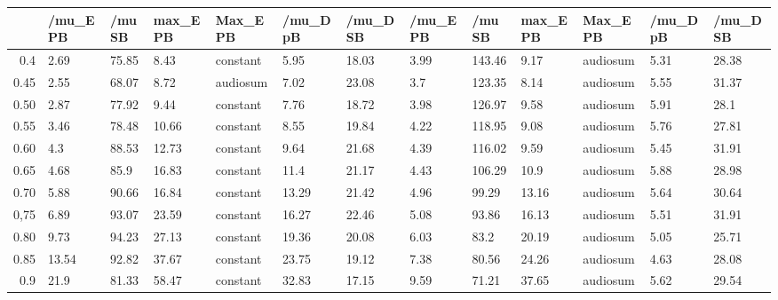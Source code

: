 \begin{table}[ht]
\centering
\begin{tabular}{rllllllllllll}
  \hline
 & /mu\_E PB & /mu SB & max\_E PB & Max\_E PB & /mu\_D pB & /mu\_D SB & /mu\_E PB & /mu SB & max\_E PB & Max\_E PB & /mu\_D pB & /mu\_D SB \\ 
  \hline
0.4 & 2.69 & 75.85 & 8.43 & constant & 5.95 & 18.03 & 3.99 & 143.46 & 9.17 & audiosum & 5.31 & 28.38 \\ 
  0.45 & 2.55 & 68.07 & 8.72 & audiosum & 7.02 & 23.08 & 3.7 & 123.35 & 8.14 & audiosum & 5.55 & 31.37 \\ 
  0.50 & 2.87 & 77.92 & 9.44 & constant & 7.76 & 18.72 & 3.98 & 126.97 & 9.58 & audiosum & 5.91 & 28.1 \\ 
  0.55 & 3.46 & 78.48 & 10.66 & constant & 8.55 & 19.84 & 4.22 & 118.95 & 9.08 & audiosum & 5.76 & 27.81 \\ 
  0.60 & 4.3 & 88.53 & 12.73 & constant & 9.64 & 21.68 & 4.39 & 116.02 & 9.59 & audiosum & 5.45 & 31.91 \\ 
  0.65 & 4.68 & 85.9 & 16.83 & constant & 11.4 & 21.17 & 4.43 & 106.29 & 10.9 & audiosum & 5.88 & 28.98 \\ 
  0.70 & 5.88 & 90.66 & 16.84 & constant & 13.29 & 21.42 & 4.96 & 99.29 & 13.16 & audiosum & 5.64 & 30.64 \\ 
  0,75 & 6.89 & 93.07 & 23.59 & constant & 16.27 & 22.46 & 5.08 & 93.86 & 16.13 & audiosum & 5.51 & 31.91 \\ 
  0.80 & 9.73 & 94.23 & 27.13 & constant & 19.36 & 20.08 & 6.03 & 83.2 & 20.19 & audiosum & 5.05 & 25.71 \\ 
  0.85 & 13.54 & 92.82 & 37.67 & constant & 23.75 & 19.12 & 7.38 & 80.56 & 24.26 & audiosum & 4.63 & 28.08 \\ 
  0.9 & 21.9 & 81.33 & 58.47 & constant & 32.83 & 17.15 & 9.59 & 71.21 & 37.65 & audiosum & 5.62 & 29.54 \\ 
   \hline
\end{tabular}
\end{table}
